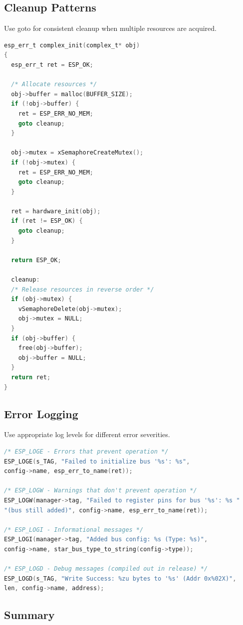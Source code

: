 \subsection{Cleanup Patterns}

Use goto for consistent cleanup when multiple resources are acquired.

\begin{lstlisting}[language=C]
esp_err_t complex_init(complex_t* obj)
{
  esp_err_t ret = ESP_OK;
  
  /* Allocate resources */
  obj->buffer = malloc(BUFFER_SIZE);
  if (!obj->buffer) {
    ret = ESP_ERR_NO_MEM;
    goto cleanup;
  }
  
  obj->mutex = xSemaphoreCreateMutex();
  if (!obj->mutex) {
    ret = ESP_ERR_NO_MEM;
    goto cleanup;
  }
  
  ret = hardware_init(obj);
  if (ret != ESP_OK) {
    goto cleanup;
  }
  
  return ESP_OK;
  
  cleanup:
  /* Release resources in reverse order */
  if (obj->mutex) {
    vSemaphoreDelete(obj->mutex);
    obj->mutex = NULL;
  }
  if (obj->buffer) {
    free(obj->buffer);
    obj->buffer = NULL;
  }
  return ret;
}
\end{lstlisting}

\subsection{Error Logging}

Use appropriate log levels for different error severities.

\begin{lstlisting}[language=C]
/* ESP_LOGE - Errors that prevent operation */
ESP_LOGE(s_TAG, "Failed to initialize bus '%s': %s",
config->name, esp_err_to_name(ret));

/* ESP_LOGW - Warnings that don't prevent operation */
ESP_LOGW(manager->tag, "Failed to register pins for bus '%s': %s "
"(bus still added)", config->name, esp_err_to_name(ret));

/* ESP_LOGI - Informational messages */
ESP_LOGI(manager->tag, "Added bus config: %s (Type: %s)",
config->name, star_bus_type_to_string(config->type));

/* ESP_LOGD - Debug messages (compiled out in release) */
ESP_LOGD(s_TAG, "Write Success: %zu bytes to '%s' (Addr 0x%02X)",
len, config->name, address);
\end{lstlisting}

\subsection{Summary}

